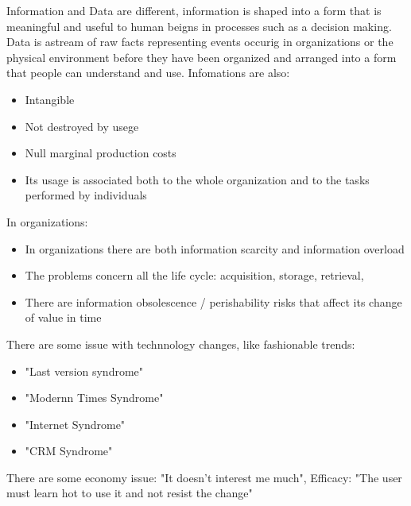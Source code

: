 \documentclass[12pt]{article}
\begin{document}
Information and Data are different, information is shaped into a form that is meaningful and useful to human beigns in processes such as a decision making. Data is astream of raw facts representing events occurig in organizations or the physical environment before they have been organized and arranged into a form that people can understand and use.
Infomations are also:
\begin{itemize}
  \item Intangible
  \item Not destroyed by usege
  \item Null marginal production costs
  \item Its usage is associated both to the whole organization and to the tasks performed by individuals
\end{itemize}
In organizations:
\begin{itemize}
  \item In organizations there are both information scarcity and information overload
  \item The problems concern all the life cycle: acquisition, storage, retrieval,
  \item There are information obsolescence / perishability risks that affect its change of value in time
\end{itemize}

There are some issue with technnology changes, like fashionable trends:
\begin{itemize}
  \item "Last version syndrome"
  \item "Modernn Times Syndrome"
  \item "Internet Syndrome"
  \item "CRM Syndrome"
\end{itemize}
There are some economy issue: "It doesn't interest me much", Efficacy: "The user must learn hot to use it and not resist the change"
\end{document}
